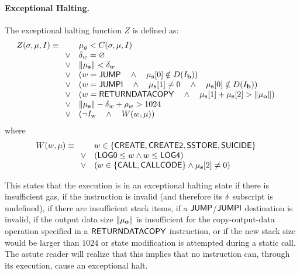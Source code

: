 \paragraph{Exceptional Halting.}\hypertarget{Exceptional_Halting_function_Z}{}
%
The exceptional halting function $Z$ is defined as:
\begin{equation}
	Z(\mathbf{\sigma}, \mathbf{\mu}, I) \equiv
	\begin{array}[t]{ll}
		& \mathbf{\mu}_g < C(\mathbf{\sigma}, \mathbf{\mu}, I) \quad \\
		\vee & \mathbf{\delta}_w = \varnothing \quad \\
		\vee & \lVert\mathbf{\mu}_\mathbf{s}\rVert < \mathbf{\delta}_w \quad \\
		\vee & \left( w =  \mathsf{JUMP} \quad \wedge \quad \mathbf{\mu}_\mathbf{s}[0] \notin D(I_\mathbf{b})  \right) \quad \\
		\vee & \left( w =  \mathsf{JUMPI} \quad \wedge \quad \mathbf{\mu}_\mathbf{s}[1] \neq 0 \quad \wedge \quad \mathbf{\mu}_\mathbf{s}[0] \notin D(I_\mathbf{b})  \right) \quad \\
		\vee & \left( w = \mathsf{RETURNDATACOPY} \quad \wedge \quad \mathbf{\mu}_{\mathbf{s}}[1] + \mathbf{\mu}_{\mathbf{s}}[2] > \lVert\mathbf{\mu}_{\mathbf{o}}\rVert \right) \quad \\
		\vee & \lVert\mathbf{\mu}_\mathbf{s}\rVert - \mathbf{\delta}_w + \mathbf{\rho}_w > 1024 \quad\\ 
		\vee & \left(\neg I_{\mathrm{w}} \quad \wedge \quad W(w, \mathbf{\mu})\right)
	\end{array}
\end{equation}
where
\begin{equation}
W(w, \mathbf{\mu}) \equiv \\
\begin{array}[t]{ll}
	& w \in \{ \mathsf{CREATE},  \mathsf{CREATE2},  \mathsf{SSTORE}, \mathsf{SUICIDE}\} \quad \\
	\vee & \left(\mathsf{LOG0} \le w \wedge w \le  \mathsf{LOG4} \right)\\
	\vee & \left(w \in \{ \mathsf{CALL},  \mathsf{CALLCODE}\} \wedge \mathbf{\mu}_{\mathbf{s}}[2] \neq 0\right)
\end{array}
\end{equation}

This states that the execution is in an exceptional halting state if there is insufficient gas, if the instruction is invalid (and therefore its $\mathbf{\delta}$ subscript is undefined), if there are insufficient stack items, if a $\mathsf{JUMP}$/$\mathsf{JUMPI}$ destination is invalid, 
if the output data size $\lVert\mathbf{\mu}_{\mathbf{o}}\rVert$ is insufficient for the copy-output-data operation specified in a $\mathsf{RETURNDATACOPY}$ instruction,
or if the new stack size would be larger than $1024$ or state modification is attempted during a static call. The astute reader will realize that this implies that no instruction can, through its execution, cause an exceptional halt.

